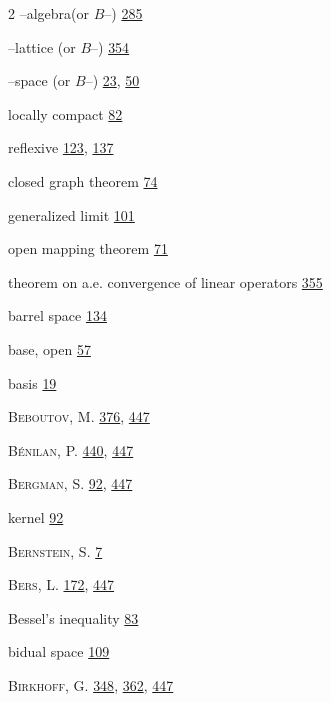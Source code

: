 \begin{multicols}{2}
\hspace*{1.1em}--algebra(or $B$--) \hyperlink{page.285}{285}\par
\hspace*{1.1em}--lattice (or $B$--) \hyperlink{page.354}{354}\par
\hspace*{1.1em}--space (or $B$--) \hyperlink{page.23}{23}, \hyperlink{page.50}{50}\par
\hspace*{2.2em}locally compact \hyperlink{page.82}{82}\par
\hspace*{2.2em}reflexive \hyperlink{page.123}{123}, \hyperlink{page.137}{137}\par
\hspace*{1.1em}closed graph theorem \hyperlink{page.74}{74}\par
\hspace*{1.1em}generalized limit \hyperlink{page.101}{101}\par
\hspace*{1.1em}open mapping theorem \hyperlink{page.71}{71}\par
\hspace*{1.1em}theorem on a.e. convergence of linear operators \hyperlink{page.355}{355}\par
\noindent barrel space \hyperlink{page.134}{134}\par
\noindent base, open \hyperlink{page.57}{57}\par
\noindent basis \hyperlink{page.19}{19}\par
\noindent \textsc{Beboutov}, M. \hyperlink{page.376}{376}, \hyperlink{page.447}{447}\par
\noindent \textsc{Bénilan}, P. \hyperlink{page.440}{440}, \hyperlink{page.447}{447}\par
\noindent \textsc{Bergman}, S. \hyperlink{page.92}{92}, \hyperlink{page.447}{447}\par
\hspace*{1.1em}kernel \hyperlink{page.92}{92}\par
\noindent \textsc{Bernstein}, S. \hyperlink{page.7}{7}\par
\noindent \textsc{Bers}, L. \hyperlink{page.172}{172}, \hyperlink{page.447}{447}\par
\noindent Bessel's inequality \hyperlink{page.83}{83}\par
\noindent bidual space \hyperlink{page.109}{109}\par
\noindent \textsc{Birkhoff}, G. \hyperlink{page.348}{348}, \hyperlink{page.362}{362}, \hyperlink{page.447}{447}\par

\end{multicols}
